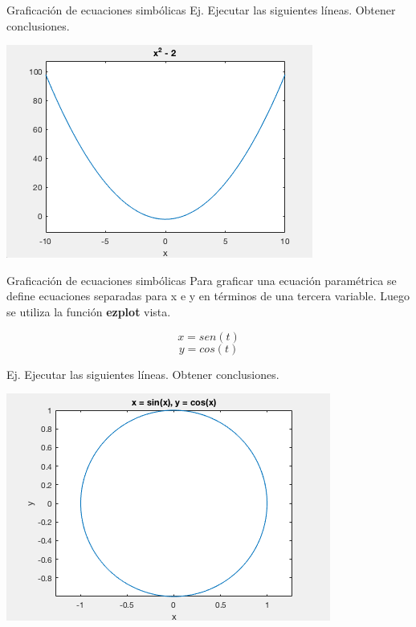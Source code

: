 \documentclass{bredelebeamer}
\begin{document}
\begin{frame}{Graficación de ecuaciones simbólicas}
Ej. Ejecutar las siguientes líneas. Obtener conclusiones.
\begin{center}
\includegraphics[scale=0.4]{images/fig3.png}
\end{center}
\end{frame}

\begin{frame}{Graficación de ecuaciones simbólicas}
Para graficar una ecuación paramétrica se define ecuaciones separadas para x e y en términos de una tercera variable. Luego se utiliza la función \textbf{ezplot} vista.
\begin{center}
\begin{equation*}
x = sen(t)
\end{equation*}
\begin{equation*}
y = cos(t)
\end{equation*}
\end{center}
Ej. Ejecutar las siguientes líneas. Obtener conclusiones.
\begin{center}
\includegraphics[scale=0.3]{images/fig4.png}
\end{center}
\end{frame}
\end{document}
